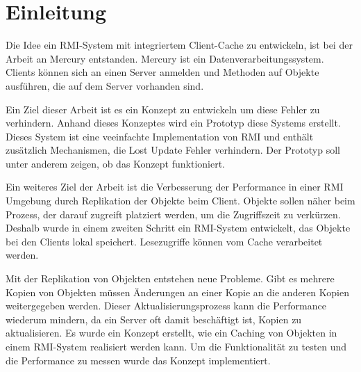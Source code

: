 \chapter{Einleitung}

Die Idee ein RMI-System mit integriertem Client-Cache zu entwickeln, ist bei der Arbeit an Mercury entstanden. Mercury ist ein Datenverarbeitungssystem. Clients können sich an einen Server anmelden und Methoden auf Objekte ausführen, die auf dem Server vorhanden sind. 

Ein Ziel dieser Arbeit ist es ein Konzept zu entwickeln um
diese Fehler zu verhindern. Anhand dieses Konzeptes wird ein Prototyp
diese Systems erstellt. Dieses System ist eine veeinfachte
Implementation von RMI und enthält zusätzlich Mechanismen, die Lost
Update Fehler verhindern. Der Prototyp soll unter anderem zeigen, ob
das Konzept funktioniert. 

Ein weiteres Ziel der Arbeit ist die Verbesserung der Performance in einer RMI Umgebung durch Replikation der Objekte beim Client. Objekte sollen näher beim Prozess, der darauf zugreift platziert werden, um die Zugriffszeit zu verkürzen. Deshalb wurde in einem zweiten Schritt ein RMI-System entwickelt, das Objekte bei den Clients lokal speichert. Lesezugriffe können vom Cache verarbeitet werden.

Mit der Replikation von Objekten entstehen neue Probleme. Gibt es mehrere Kopien von Objekten müssen Änderungen an einer Kopie an die anderen Kopien weitergegeben werden. Dieser Aktualisierungsprozess kann die Performance wiederum mindern, da ein Server oft damit beschäftigt ist, Kopien zu aktualisieren. Es wurde ein Konzept erstellt, wie ein Caching von Objekten in einem RMI-System realisiert werden kann. Um die Funktionalität zu testen und die Performance zu messen wurde das Konzept implementiert. 
